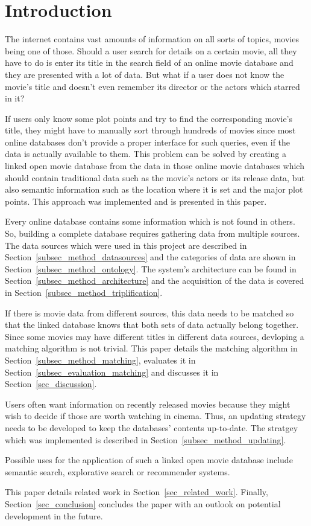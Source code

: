 \section{Introduction}
\label{sec_introduction}

The internet contains vast amounts of information on all sorts of topics, movies being one of those.
Should a user search for details on a certain movie, all they have to do is enter its title in the search field of an online movie database and they are presented with a lot of data.
But what if a user does not know the movie's title and doesn't even remember its director or the actors which starred in it?

If users only know some plot points and try to find the corresponding movie's title, they might have to manually sort through hundreds of movies since most online databases don't provide a proper interface for such queries, even if the data is actually available to them.
This problem can be solved by creating a linked open movie database from the data in those online movie databases which should contain traditional data such as the movie's actors or its release data, but also semantic information such as the location where it is set and the major plot points.
This approach was implemented and is presented in this paper.

Every online database contains some information which is not found in others.
So, building a complete database requires gathering data from multiple sources.
The data sources which were used in this project are described in Section~\ref{subsec_method_datasources} and the categories of data are shown in Section~\ref{subsec_method_ontology}.
The system's architecture can be found in Section~\ref{subsec_method_architecture} and the acquisition of the data is covered in Section~\ref{subsec_method_triplification}.

If there is movie data from different sources, this data needs to be matched so that the linked database knows that both sets of data actually belong together.
Since some movies may have different titles in different data sources, devloping a matching algorithm is not trivial.
This paper details the matching algorithm in Section~\ref{subsec_method_matching}, evaluates it in Section~\ref{subsec_evaluation_matching} and discusses it in Section~\ref{sec_discussion}.

Users often want information on recently released movies because they might wish to decide if those are worth watching in cinema.
Thus, an updating strategy needs to be developed to keep the databases' contents up-to-date.
The stratgey which was implemented is described in Section~\ref{subsec_method_updating}.

Possible uses for the application of such a linked open movie database include semantic search, explorative search or recommender systems.

This paper details related work in Section~\ref{sec_related_work}.
Finally, Section~\ref{sec_conclusion} concludes the paper with an outlook on potential development in the future.
